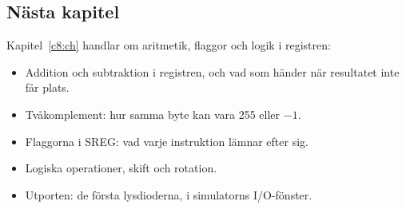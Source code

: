 \subsection*{Nästa kapitel}
Kapitel~\ref{c8:ch} handlar om aritmetik, flaggor och logik i registren:
\begin{itemize}
  \item Addition och subtraktion i registren, och vad som händer när resultatet inte får plats.
  \item Tvåkomplement: hur samma byte kan vara 255 eller $-1$.
  \item Flaggorna i SREG: vad varje instruktion lämnar efter sig.
  \item Logiska operationer, skift och rotation.
  \item Utporten: de första lysdioderna, i simulatorns I/O-fönster.
\end{itemize}
